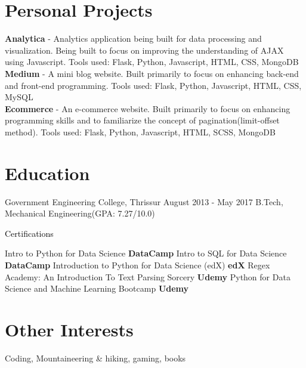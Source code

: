 \documentclass[a4paper,14pt]{twentysecondcv} %
\begin{document}
\section{Personal Projects}
\vspace{4px}

\begin{spacing}{1.2}
\large
\textbf{Analytica} - Analytics application being built for data processing and visualization. Being built to focus on improving the understanding of AJAX using Javascript. Tools used: Flask, Python, Javascript, HTML, CSS, MongoDB\\
\textbf{Medium} - A mini blog website. Built primarily to focus on enhancing back-end and front-end programming. Tools used: Flask, Python, Javascript, HTML, CSS, MySQL\\
\textbf{Ecommerce} - An e-commerce website. Built primarily to focus on enhancing programming skills and to familiarize the concept of pagination(limit-offset method). Tools used: Flask, Python, Javascript, HTML, SCSS, MongoDB\\
\end{spacing}


\pagebreak
\makeprofiletwo

\vspace*{5mm}
\section{Education}

\begin{twenty} %
	\twentyitem
		{{Government Engineering College, Thrissur}}
    	{August 2013 - May 2017}
        {B.Tech, Mechanical Engineering\textnormal{(GPA: 7.27/10.0)}}
        {}
        {}
        {}
\end{twenty}

\large{\textcolor{black}{Certifications}}
\vspace{4px}

\begin{twentyshort}
	\twentyitemshort
		{}
		{Intro to Python for Data Science}
		{\textbf{DataCamp}}
	\twentyitemshort
		{}
		{Intro to SQL for Data Science}
		{\textbf{DataCamp}}
	\twentyitemshort
		{}
		{Introduction to Python for Data Science (edX)}
		{\textbf{edX}}
	\twentyitemshort
		{}
		{Regex Academy: An Introduction To Text Parsing Sorcery}
		{\textbf{Udemy}}
	\twentyitemshort
		{}
		{Python for Data Science and Machine Learning Bootcamp}
		{\textbf{Udemy}}
\end{twentyshort}

\section{Other Interests}
\vspace{4px}

\begin{twenty}
Coding, Mountaineering \& hiking, gaming, books
\end{twenty}
\end{document}
